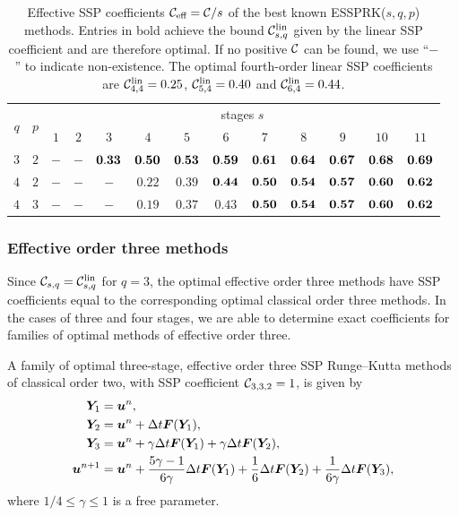 \documentclass[final]{siamltex}  %
\begin{document}
\begin{table}
\caption{Effective SSP coefficients $ \mathcal{C}_{\textnormal{eff}} = \mathcal{C}/s$ of the best known ESSPRK($s,q,p$) methods.
    		Entries in bold achieve the bound $\mathcal{C}^{\textnormal{lin}}_{s,q}$ given by the linear SSP coefficient and are therefore optimal. 
    		If no positive $\mathcal{C}$ can be found, we use ``$-$'' to indicate non-existence. 
    		The optimal fourth-order linear SSP coefficients are $\mathcal{C}^{\textnormal{lin}}_{4,4}=0.25$,
    		$\mathcal{C}^{\textnormal{lin}}_{5,4}=0.40$ and $\mathcal{C}^{\textnormal{lin}}_{6,4}=0.44$.}
    \centering
    \begin{tabular}{ccccccccccccc}
        \toprule
        \multirow{2}{*}{$q$} &
        \multirow{2}{*}{$p$}
            & \multicolumn{11}{c}{stages $s$} \\
            \cmidrule{3-13}
& & $1$ & $2$ & $3$ & $4$ & $5$ & $6$ & $7$ & $8$ & $9$ & $10$ & $11$ \\
        \midrule
        $3$ & $2$ & $-$ & $-$ & $\bf 0.33$ & $\bf 0.50$ & $\bf 0.53$ & $\bf 0.59$ & $\bf 0.61$ & $\bf 0.64$ & $\bf 0.67$ & $\bf 0.68$ & $\bf 0.69$\\
        $4$ & $2$ & $-$ & $-$ & $-$ & $0.22$ & $0.39$ & $\bf 0.44$ & $\bf 0.50$ & $\bf 0.54$ & $\bf 0.57$ & $\bf 0.60$ & $\bf 0.62$ \\
        $4$ & $3$ & $-$ & $-$ & $-$ & $0.19$ & $0.37$ & $0.43$ & $\bf 0.50$ & $\bf 0.54$ & $\bf 0.57$ & $\bf 0.60$ & $\bf 0.62$ \\
        \bottomrule
    \end{tabular}
    \label{tab:eff_SSP_coeff}
\end{table}

\subsubsection{Effective order three methods}\label{subsubsec:3rd_ESSPRK}
Since $\mathcal{C}_{s,q}=\mathcal{C}^{\textnormal{lin}}_{s,q}$ for $q=3$, the optimal effective order three methods
have SSP coefficients equal to the corresponding optimal classical order three methods.
In the cases of three and four stages, we are able to determine exact coefficients for
families of optimal methods of effective order three.
\begin{theorem}\label{thm:ESSPRK(3,3,2)}
	A family of optimal three-stage, effective order three SSP Runge--Kutta 
	methods of classical order two, with SSP coefficient $\mathcal{C}_{3,3,2} = 1$, is given by
    \begin{displaymath}
    		\begin{split}
    			\bm{Y}_1 &= \bm{u}^n, \\
    			\bm{Y}_2 &= \bm{u}^n + \Delta t\bm{F}(\bm{Y}_1), \\
    			\bm{Y}_3 &= \bm{u}^n + \gamma\Delta t\bm{F}(\bm{Y}_1) + \gamma\Delta t\bm{F}(\bm{Y}_2), \\
    			\bm{u}^{n+1} &= \bm{u}^n + \frac{5\gamma-1}{6\gamma}\Delta t\bm{F}(\bm{Y}_1) + \frac{1}{6}\Delta t\bm{F}(\bm{Y}_2) + \frac{1}{6\gamma}\Delta t\bm{F}(\bm{Y}_3),
        \end{split}
    \end{displaymath}
    where $1/4 \leq \gamma \leq 1$ is a free parameter.
\end{theorem}
\end{document}
